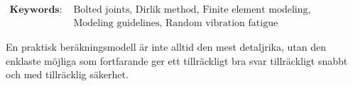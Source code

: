 \documentclass[a4paper,twoside]{bth}
\begin{document}
\vspace{1cm}
\noindent
$\begin{aligned}
    \textbf{Keywords: } &\text{Bolted joints, Dirlik method, Finite element modeling,}\\ &  \text{Modeling guidelines, Random vibration fatigue}
\end{aligned}$

\cleardoublepage


\sammanfattning
En praktisk beräkningsmodell är inte alltid den mest detaljrika, utan den enklaste möjliga som fortfarande ger ett tillräckligt bra svar tillräckligt snabbt och med tillräcklig säkerhet.
\end{document}
